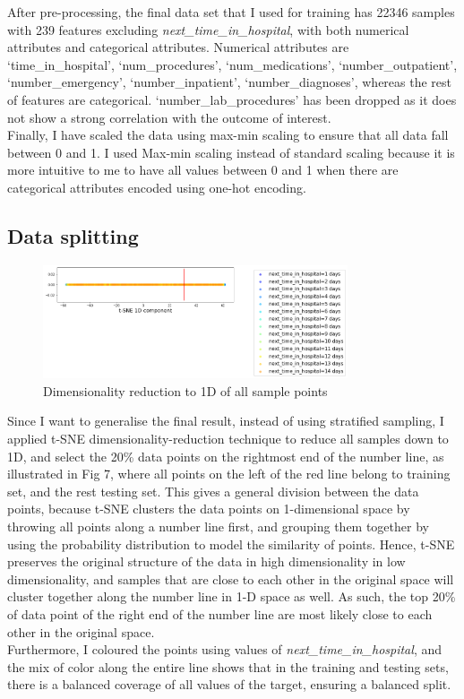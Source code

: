 \documentclass[letterpaper, 12 pt, conference]{ieeeconf}  %
\begin{document}
After pre-processing, the final data set that I used for training has 22346 samples with 239 features excluding \textit{next\_time\_in\_hospital}, with both numerical attributes and categorical attributes. Numerical attributes are `time\_in\_hospital', `num\_procedures', `num\_medications', `number\_outpatient', `number\_emergency', `number\_inpatient', `number\_diagnoses', whereas the rest of features are categorical. `number\_lab\_procedures' has been dropped as it does not show a strong correlation with the outcome of interest.\\\newline
Finally, I have scaled the data using max-min scaling to ensure that all data fall between 0 and 1. I used Max-min scaling instead of standard scaling because it is more intuitive to me to have all values between 0 and 1 when there are categorical attributes encoded using one-hot encoding.
\subsection{Data splitting}
\begin{figure}[h]
  \includegraphics[width=9cm]{./figs/tSNE_split.png}
  \caption{Dimensionality reduction to 1D of all sample points}
  \label{fig:boat1}
\end{figure}
Since I want to generalise the final result, instead of using stratified sampling, I applied t-SNE dimensionality-reduction technique to reduce all samples down to 1D, and select the 20\% data points on the rightmost end of the number line, as illustrated in Fig 7, where all points on the left of the red line belong to training set, and the rest testing set. This gives a general division between the data points, because t-SNE clusters the data points on 1-dimensional space by throwing all points along a number line first, and grouping them together by using the probability distribution to model the similarity of points. Hence, t-SNE preserves the original structure of the data in high dimensionality in low dimensionality, and samples that are close to each other in the original space will cluster together along the number line in 1-D space as well. As such, the top 20\% of data point of the right end of the number line are most likely close to each other in the original space. \\\newline 
Furthermore, I coloured the points using values of \textit{ next\_time\_in\_hospital}, and the mix of color along the entire line shows that in the training and testing sets, there is a balanced coverage of all values of the target, ensuring a balanced split.
\end{document}
